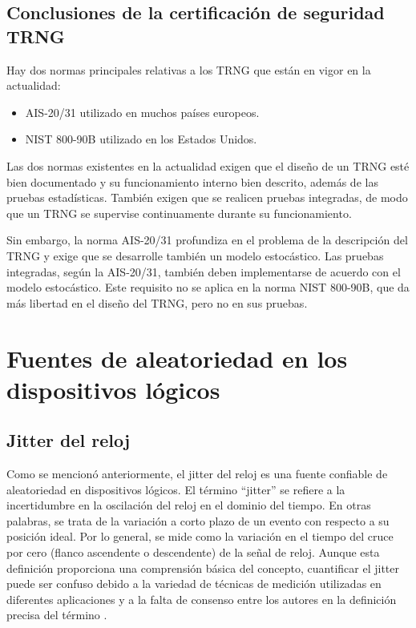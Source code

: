 		\subsection{Conclusiones de la certificación de seguridad TRNG}
		
            Hay dos normas principales relativas a los TRNG que están en vigor en la actualidad:
            
            \begin{itemize}[noitemsep]
                \item AIS-20/31 utilizado en muchos países europeos. \cite{AIS2011}
                \item NIST 800-90B utilizado en los Estados Unidos. \cite{Turan2018}
            \end{itemize}
        
            Las dos normas existentes en la actualidad exigen que el diseño de un TRNG esté bien documentado y su funcionamiento interno bien descrito, además de las pruebas estadísticas. También exigen que se realicen pruebas integradas, de modo que un TRNG se supervise continuamente durante su funcionamiento.
        
            Sin embargo, la norma AIS-20/31 profundiza en el problema de la descripción del TRNG y exige que se desarrolle también un modelo estocástico. Las pruebas integradas, según la AIS-20/31, también deben implementarse de acuerdo con el modelo estocástico. Este requisito no se aplica en la norma NIST 800-90B, que da más libertad en el diseño del TRNG, pero no en sus pruebas.

    \section{Fuentes de aleatoriedad en los dispositivos lógicos}

        \subsection{Jitter del reloj}

            Como se mencionó anteriormente, el jitter del reloj es una fuente confiable de aleatoriedad en dispositivos lógicos. El término ``jitter'' se refiere a la incertidumbre en la oscilación del reloj en el dominio del tiempo. En otras palabras, se trata de la variación a corto plazo de un evento con respecto a su posición ideal. Por lo general, se mide como la variación en el tiempo del cruce por cero (flanco ascendente o descendente) de la señal de reloj. Aunque esta definición proporciona una comprensión básica del concepto, cuantificar el jitter puede ser confuso debido a la variedad de técnicas de medición utilizadas en diferentes aplicaciones y a la falta de consenso entre los autores en la definición precisa del término \cite{Valtchanov2008}.

